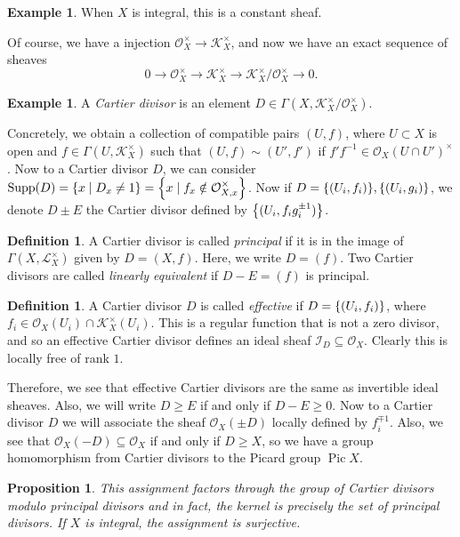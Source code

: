 \documentclass[leqno, openany]{memoir}
\newtheorem{prop}[thm]{Proposition}
\theoremstyle{definition}
\newtheorem{defn}[thm]{Definition}
\newtheorem{exm}[thm]{Example}
\theoremstyle{remark}
\theoremstyle{plain}
\theoremstyle{definition}
\theoremstyle{remark}
\newcommand{\mc}[1]{\mathcal{#1}}
\DeclareMathOperator{\Supp}{Supp}
\DeclareMathOperator{\Pic}{Pic}
\begin{document}
\begin{exm}
    When $X$ is integral, this is a constant sheaf. 
\end{exm}

Of course, we have a injection $\mc{O}_X^{\times} \to {\mc{K}_X^{\times}}$, and now we have an exact sequence of sheaves
\[ 0 \to \mc{O}_X^{\times} \to \mc{K}_X^{\times} \to \mc{K}_X^{\times} / \mc{O}_X^{\times} \to 0. \]

\begin{exm}
    A \textit{Cartier divisor} is an element $D \in \Gamma(X, \mc{K}_X^{\times} / \mc{O}_X^{\times})$.
\end{exm}

Concretely, we obtain a collection of compatible pairs $(U,f)$, where $U \subset X$ is open and $f \in \Gamma(U, \mc{K}_X^{\times})$ such that $(U, f) \sim (U', f')$ if $f' f^{-1} \in {\mc{O}_X(U \cap U')}^{\times}$. Now to a Cartier divisor $D$, we can consider $\Supp(D) = \qty{x \mid D_x \neq 1} = \qty{x \mid f_x \notin \mc{O}_{X,x}^{\times}}$. Now if $D = \qty{(U_i, f_i)}, \qty{(U_i, g_i)}$, we denote $D \pm E$ the Cartier divisor defined by $\qty{(U_i, f_i g_i^{\pm 1})}$.

\begin{defn}
    A Cartier divisor is called \textit{principal} if it is in the image of $\Gamma(X, \mc{L}_X^{\times})$ given by $D = {(X, f)}$. Here, we write $D = (f)$. Two Cartier divisors are called \textit{linearly equivalent} if $D-E = (f)$ is principal.
\end{defn}

\begin{defn}
    A Cartier divisor $D$ is called \textit{effective} if $D = \qty{(U_i, f_i)}$, where $f_i \in \mc{O}_X(U_i) \cap \mc{K}_X^{\times}(U_i)$. This is a regular function that is not a zero divisor, and so an effective Cartier divisor defines an ideal sheaf $\mc{I}_D \subseteq \mc{O}_X$. Clearly this is locally free of rank $1$.
\end{defn}

Therefore, we see that effective Cartier divisors are the same as invertible ideal sheaves. Also, we will write $D \geq E$ if and only if $D - E \geq 0$. Now to a Cartier divisor $D$ we will associate the sheaf $\mc{O}_X(\pm D)$ locally defined by $f_i^{\mp 1}$. Also, we see that $\mc{O}_X(-D) \subseteq \mc{O}_X$ if and only if $D \geq X$, so we have a group homomorphism from Cartier divisors to the Picard group $\Pic X$.

\begin{prop}
    This assignment factors through the group of Cartier divisors modulo principal divisors and in fact, the kernel is precisely the set of principal divisors. If $X$ is integral, the assignment is surjective.
\end{prop}
\end{document}
